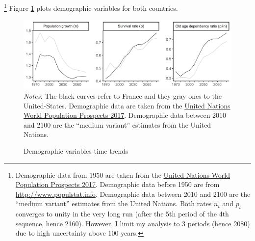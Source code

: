 \footnote{Demographic data from 1950 are taken from the \href{https://population.un.org/wpp/}{United Nations World Population Prospects 2017}. Demographic data before 1950 are from \href{http://www.populstat.info}{http://www.populstat.info}. Demographic data between 2010 and 2100 are the ``medium variant'' estimates from the United Nations. Both rates $n_t$ and $p_t$ converges to unity in the very long run (after the 5th period of the 4th sequence, hence 2160). However, I limit my analysis to 3 periods (hence 2080) due to high uncertainty above 100 years.} Figure \ref{fig:demo} plots demographic variables for both countries.

\begin{figure}[tb]
	\centering
	\caption{Demographic variables time trends}\label{fig:demo}
	\includegraphics[width=\linewidth]{../result/demo_npdep.png} 
	\vspace{-6ex}
	\justify\singlespacing\footnotesize \textit{Notes:} The black curves refer to France and they gray ones to the United-States. Demographic data are taken from the \href{https://population.un.org/wpp/}{United Nations World Population Prospects 2017}. Demographic data between 2010 and 2100 are the ``medium variant'' estimates from the United Nations.
\end{figure}

